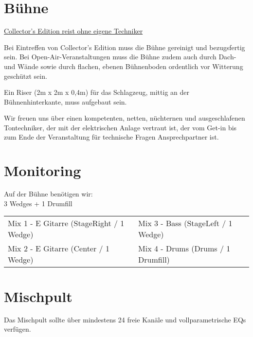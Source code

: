 \section*{Bühne}

\underline{Collector's Edition reist ohne eigene Techniker}

Bei Eintreffen von Collector's Edition muss die B\"uhne gereinigt und bezugsfertig sein.
Bei Open-Air-Veranstaltungen muss die Bühne zudem auch durch Dach- und Wände sowie
durch flachen, ebenen Bühnenboden ordentlich vor Witterung geschützt sein.

Ein Riser (2m x 2m x 0,4m) für das Schlagzeug, mittig an der Bühnenhinterkante, muss aufgebaut
sein.

Wir freuen uns über einen kompetenten, netten, nüchternen und ausgeschlafenen Tontechniker, der
mit der elektrischen Anlage vertraut ist, der vom Get-in bis zum Ende der Veranstaltung für technische
Fragen Ansprechpartner ist.

\section*{Monitoring}

Auf der Bühne benötigen wir:\\
3 Wedges + 1 Drumfill\\

\begin{tabular}{l l}
Mix 1 - E Gitarre (StageRight / 1 Wedge) & Mix 3 - Bass (StageLeft / 1 Wedge) \\
Mix 2 - E Gitarre (Center / 1 Wedge)     & Mix 4 - Drums (Drums / 1 Drumfill) \\
\end{tabular}

\section*{Mischpult}
Das Mischpult sollte über mindestens 24 freie Kanäle und vollparametrische EQs verfügen.
